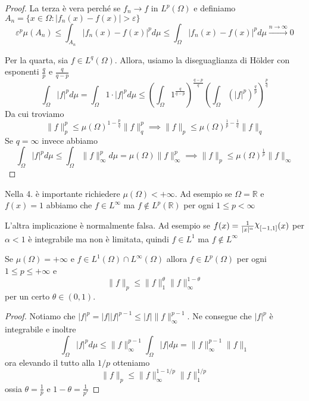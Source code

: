 \begin{proof}
La terza è vera perché se \(f_{n} \to
f\) in \(L^{p}{(\Omega)}\) e definiamo \(A_{n} = \{x \in \Omega : \left|
f_{n}{(x)}-f{(x)} \right| > \varepsilon\} \) 
\[
    \varepsilon^{p} \mu(A_{n}) \le \int_{A_{n}} \left| f_{n}{(x)} - f{(x)}
    \right|^{p} d\mu \le \int_{\Omega} \left| f_{n}{(x)} - f{(x)} \right|^{p}
    d\mu \overset{n \to \infty}{\longrightarrow} 0
\]

    Per la quarta, sia \(f \in L^{q}{(\Omega)}\). Allora, usiamo la
    diseguaglianza di Hölder con esponenti \(\frac{q}{p}\) e \(\frac{q}{q-p}\) 
    \[
        \int_{\Omega} \left| f \right|^{p} d\mu = \int_{\Omega} 1 \cdot
        |f|^{p}d\mu \le {\left( \int_{\Omega} 1^{\frac{q}{q-p}}
        \right)}^{\frac{q-p}{q}} {\left( \int_{\Omega} {\left( |f|^{p}
        \right)}^{\frac{q}{p}}  \right)}^{\frac{p}{q}}
    \]
    Da cui troviamo 
    \[
    \|f\|_p^{p} \le {\mu(\Omega)}^{1 - \frac{p}{q}} \|f\|_q^{p} \implies
    \|f\|_p \le {\mu(\Omega)}^{\frac{1}{p} - \frac{1}{q}} \|f\|_q
    \]
    Se \(q = \infty\) invece abbiamo 
    \[
        \int_\Omega |f|^{p} d\mu \le \int_{\Omega} \|f\|^{p}_{\infty} d\mu =
        \mu(\Omega) \|f\|_{\infty}^{p} \implies \|f\|_p \le
        {\mu(\Omega)}^{\frac{1}{p}} \|f\|_{\infty}
    \]
\end{proof}
\begin{example}
    Nella 4. è importante richiedere \(\mu{(\Omega )} < +\infty\). Ad esempio se
    \(\Omega = \mathbb{R}\) e \(f{(x)} = 1\) abbiamo che \(f \in L^{\infty}\) ma
    \(f \not\in L^{p}{(\mathbb{R})}\) per ogni \(1 \le p < \infty\) 
\end{example}
\begin{example}
    L'altra implicazione è normalmente falsa. Ad esempio se \(f{(x)} =
    \frac{1}{|x|^{\alpha}} \rchi_{[-1,1]}{(x)} \) per \(\alpha < 1\) è
    integrabile ma non è limitata, quindi \(f \in L^{1}\) ma \(f\not\in L^{\infty}\) 
\end{example}
\begin{proposition}
    Se \(\mu{(\Omega)} = +\infty\) e \(f \in L^{1}{(\Omega)} \cap
    L^{\infty}{(\Omega)}\) allora \(f \in L^{p}{(\Omega)}\) per ogni \(1 \le p
    \le +\infty\) e
    \[
        \|f\|_p \le \|f\|_1^{\theta} \|f\|_{\infty}^{1-\theta} 
    \]
    per un certo \(\theta \in {(0,1)}\).
\end{proposition}
\begin{proof}
    Notiamo che \(|f|^{p} = |f||f|^{p-1} \le |f| \|f\|_\infty^{p-1}\). Ne
    consegue che \(|f|^{p }\) è integrabile e inoltre
    \[
        \int_\Omega |f|^{p} d\mu \le \|f\|_\infty^{p-1} \int_\Omega |f| d\mu =
        \|f\|_\infty^{p-1} \|f\|_1
    \]
    ora elevando il tutto alla \(1/p\) otteniamo
    \[
        \|f\|_p \le \|f\|_\infty^{1-1/p} \|f\|_1^{1/p}
    \]
    ossia \(\displaystyle \theta = \frac{1}{p}\) e \(\displaystyle 1 - \theta = \frac{1}{p'}\) 
\end{proof}
